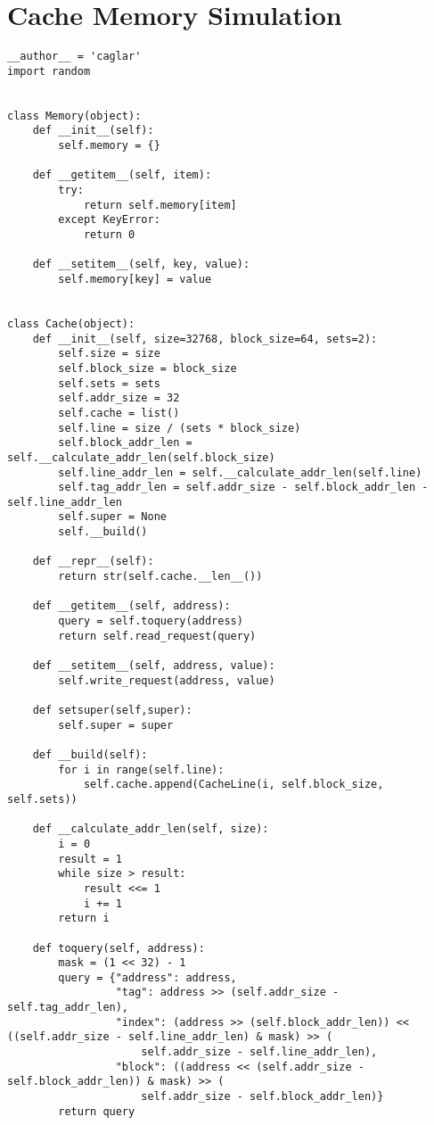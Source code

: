 \chapter{Cache Memory Simulation}
\lstset{language=Python} 
\begin{lstlisting}
__author__ = 'caglar'
import random


class Memory(object):
    def __init__(self):
        self.memory = {}

    def __getitem__(self, item):
        try:
            return self.memory[item]
        except KeyError:
            return 0

    def __setitem__(self, key, value):
        self.memory[key] = value


class Cache(object):
    def __init__(self, size=32768, block_size=64, sets=2):
        self.size = size
        self.block_size = block_size
        self.sets = sets
        self.addr_size = 32
        self.cache = list()
        self.line = size / (sets * block_size)
        self.block_addr_len = self.__calculate_addr_len(self.block_size)
        self.line_addr_len = self.__calculate_addr_len(self.line)
        self.tag_addr_len = self.addr_size - self.block_addr_len - self.line_addr_len
        self.super = None
        self.__build()

    def __repr__(self):
        return str(self.cache.__len__())

    def __getitem__(self, address):
        query = self.toquery(address)
        return self.read_request(query)

    def __setitem__(self, address, value):
        self.write_request(address, value)

    def setsuper(self,super):
        self.super = super

    def __build(self):
        for i in range(self.line):
            self.cache.append(CacheLine(i, self.block_size, self.sets))

    def __calculate_addr_len(self, size):
        i = 0
        result = 1
        while size > result:
            result <<= 1
            i += 1
        return i

    def toquery(self, address):
        mask = (1 << 32) - 1
        query = {"address": address,
                 "tag": address >> (self.addr_size - self.tag_addr_len),
                 "index": (address >> (self.block_addr_len)) << ((self.addr_size - self.line_addr_len) & mask) >> (
                     self.addr_size - self.line_addr_len),
                 "block": ((address << (self.addr_size - self.block_addr_len)) & mask) >> (
                     self.addr_size - self.block_addr_len)}
        return query


\end{lstlisting}
